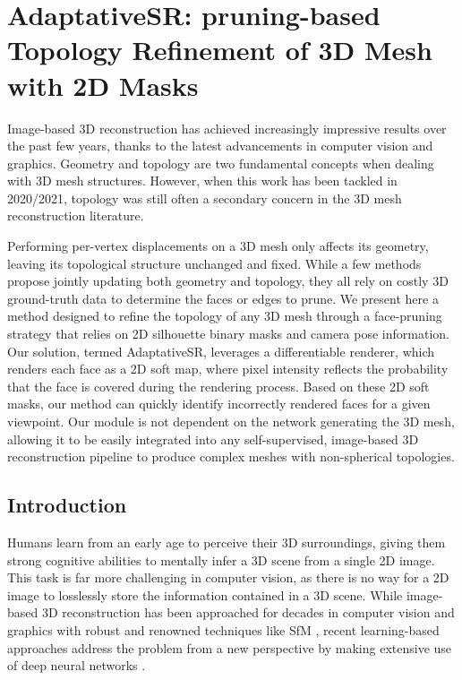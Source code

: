 \chapter{AdaptativeSR: pruning-based Topology Refinement of 3D Mesh with 2D Masks
}
\label{chapter:appendix-adaptativeSR}

{}



Image-based 3D reconstruction has achieved increasingly impressive results over the past few years, thanks to the latest advancements in computer vision and graphics. Geometry and topology are two fundamental concepts when dealing with 3D mesh structures. However, when this work has been tackled in 2020/2021, topology was still often a secondary concern in the 3D mesh reconstruction literature. 

Performing per-vertex displacements on a 3D mesh only affects its geometry, leaving its topological structure unchanged and fixed. While a few methods propose jointly updating both geometry and topology, they all rely on costly 3D ground-truth data to determine the faces or edges to prune. We present here a method designed to refine the topology of any 3D mesh through a face-pruning strategy that relies on 2D silhouette binary masks and camera pose information. Our solution, termed AdaptativeSR, leverages a differentiable renderer, which renders each face as a 2D soft map, where pixel intensity reflects the probability that the face is covered during the rendering process. Based on these 2D soft masks, our method can quickly identify incorrectly rendered faces for a given viewpoint. Our module is not dependent on the network generating the 3D mesh, allowing it to be easily integrated into any self-supervised, image-based 3D reconstruction pipeline to produce complex meshes with non-spherical topologies.

\section{Introduction}
\label{appendix:adaptativesr-intro}

Humans learn from an early age to perceive their 3D surroundings, giving them strong cognitive abilities to mentally infer a 3D scene from a single 2D image. This task is far more challenging in computer vision, as there is no way for a 2D image to losslessly store the information contained in a 3D scene. While image-based 3D reconstruction has been approached for decades in computer vision and graphics with robust and renowned techniques like \ac{SfM} \citep{longuet1981computer}, recent learning-based approaches address the problem from a new perspective by making extensive use of deep neural networks
\citep{kanazawa2018learning,deng2019accurate,saito2020pifuhd}.

